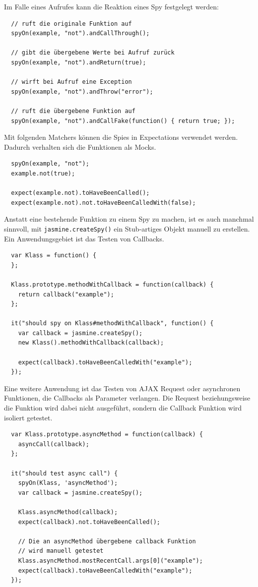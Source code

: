 \documentclass[11pt, a4paper]{article}
\begin{document}
Im Falle eines Aufrufes kann die Reaktion eines Spy festgelegt werden:

\begin{verbatim}
  // ruft die originale Funktion auf
  spyOn(example, "not").andCallThrough();

  // gibt die übergebene Werte bei Aufruf zurück
  spyOn(example, "not").andReturn(true);

  // wirft bei Aufruf eine Exception
  spyOn(example, "not").andThrow("error");

  // ruft die übergebene Funktion auf
  spyOn(example, "not").andCallFake(function() { return true; });
\end{verbatim}

Mit folgenden Matchers können die Spies in Expectations verwendet werden.
Dadurch verhalten sich die Funktionen als Mocks.

\begin{verbatim}
  spyOn(example, "not");
  example.not(true);

  expect(example.not).toHaveBeenCalled();
  expect(example.not).not.toHaveBeenCalledWith(false);
\end{verbatim}

Anstatt eine bestehende Funktion zu einem Spy zu machen, ist es auch manchmal
sinnvoll, mit \texttt{jasmine.createSpy()} ein Stub-artiges Objekt manuell zu erstellen.
Ein Anwendungsgebiet ist das Testen von Callbacks\cite{jasmine_jasmine_2011-1}.

\begin{verbatim}
  var Klass = function() {
  };

  Klass.prototype.methodWithCallback = function(callback) {
    return callback("example");
  };

  it("should spy on Klass#methodWithCallback", function() {
    var callback = jasmine.createSpy();
    new Klass().methodWithCallback(callback);

    expect(callback).toHaveBeenCalledWith("example");
  });
\end{verbatim}

Eine weitere Anwendung ist das Testen von AJAX Request oder asynchronen
Funktionen, die Callbacks als Parameter verlangen. Die Request beziehungsweise
die Funktion wird dabei nicht ausgeführt, sondern die Callback Funktion wird
isoliert getestet.

\begin{verbatim}
  var Klass.prototype.asyncMethod = function(callback) {
    asyncCall(callback);
  };

  it("should test async call") {
    spyOn(Klass, 'asyncMethod');
    var callback = jasmine.createSpy();

    Klass.asyncMethod(callback);
    expect(callback).not.toHaveBeenCalled();

    // Die an asyncMethod übergebene callback Funktion
    // wird manuell getestet
    Klass.asyncMethod.mostRecentCall.args[0]("example");
    expect(callback).toHaveBeenCalledWith("example");
  });
\end{verbatim}
\end{document}
